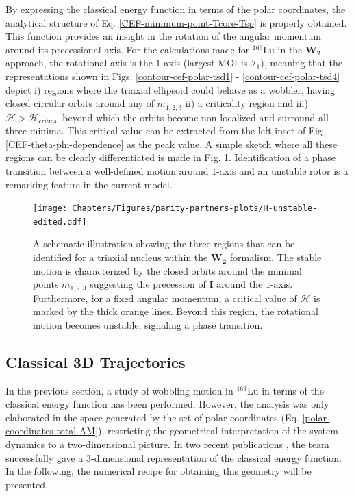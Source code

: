 By expressing the classical energy function in terms of the polar coordinates, the analytical structure of Eq. \ref{CEF-minimum-point-Tcore-Tsp} is properly obtained. This function provides an insight in the rotation of the angular momentum around its precessional axis. For the calculations made for $^{163}$Lu in the $\mathbf{W_2}$ approach, the rotational axis is the $1$-axis (largest MOI is $\mathcal{I}_1$), meaning that the representations shown in Figs. \ref{contour-cef-polar-tsd1} - \ref{contour-cef-polar-tsd4} depict i) regions where the triaxial ellipsoid could behave as a wobbler, having closed circular orbits around any of $m_{1,2,3}$ ii) a criticality region and iii) $\mathcal{H}>\mathcal{H}_\text{critical}$ beyond which the orbits become non-localized and surround all three minima. This critical value can be extracted from the left inset of Fig \ref{CEF-theta-phi-dependence} as the peak value. A simple sketch where all these regions can be clearly differentiated is made in Fig. \ref{fig-H-unstable-sketch}. Identification of a phase transition between a well-defined motion around $1$-axis and an unstable rotor is a remarking feature in the current model.
\begin{figure}
    \centering
    \texttt{[image: Chapters/Figures/parity-partners-plots/H-unstable-edited.pdf]}
    \caption{A schematic illustration showing the three regions that can be identified for a triaxial nucleus within the $\mathbf{W_2}$ formalism. The stable motion is characterized by the closed orbits around the minimal points $m_{1,2,3}$ suggesting the precession of $\mathbf{I}$ around the $1$-axis. Furthermore, for a fixed angular momentum, a critical value of $\mathcal{H}$ is marked by the thick orange lines. Beyond this region, the rotational motion becomes unstable, signaling a phase transition.}
    \label{fig-H-unstable-sketch}
\end{figure}

\subsection{Classical 3D Trajectories}

In the previous section, a study of wobbling motion in $^{163}$Lu in terms of the classical energy function has been performed. However, the analysis was only elaborated in the space generated by the set of polar coordinates (Eq. \ref{polar-coordinates-total-AM}), restricting the geometrical interpretation of the system dynamics to a two-dimensional picture. In two recent publications \cite{poenaru2021extensive1,poenaru2021extensive2}, the team successfully gave a $3$-dimensional representation of the classical energy function. In the following, the numerical recipe for obtaining this geometry will be presented.

